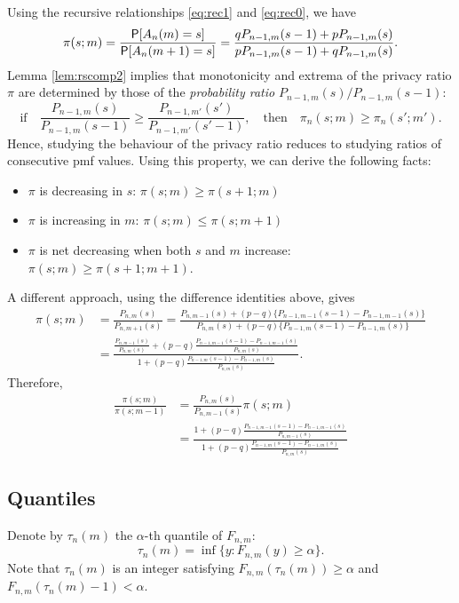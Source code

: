 \documentclass[11pt,draft]{article}
\begin{document}
Using the recursive relationships \eqref{eq:rec1} and \eqref{eq:rec0}, we have
\[ \pi(s; m) = \frac{\P[A_n(m) = s]}{\P[A_n(m+1) = s]}
 = \frac{q P_{n-1, m}(s-1) + p P_{n-1, m}(s)}
 {p P_{n-1, m}(s-1) + q P_{n-1, m}(s)}.
\]
Lemma \ref{lem:rscomp2} implies that monotonicity and extrema of  the privacy ratio $\pi$ are determined by those of the \emph{probability ratio} $P_{n-1, m}(s)/P_{n-1,m}(s-1)$:
\[ \text{if}\quad \frac{P_{n-1,m}(s)}{P_{n-1,m}(s-1)} \geq \frac{P_{n-1,m'}(s')}{P_{n-1,m'}(s'-1)},
\quad\text{then}\quad \pi_n(s;m) \geq \pi_n(s';m'). \]
Hence, studying the behaviour of the privacy ratio reduces to studying 
ratios of consecutive pmf values.
Using this property, we can derive the following facts:
\begin{itemize}
\item $\pi$ is decreasing in $s$: $\pi(s;m) \geq \pi(s+1; m)$
\item $\pi$ is increasing in $m$: $\pi(s;m) \leq \pi(s; m+1)$
\item $\pi$ is net decreasing when both $s$ and $m$ increase:
$\pi(s;m) \geq \pi(s+1; m+1)$.
\end{itemize}

A different approach, using the difference identities above, gives
\begin{align*}
\pi(s; m) &= \frac{P_{n,m}(s)}{P_{n,m+1}(s)}
 = \frac{P_{n,m-1}(s) + (p-q)\{P_{n-1,m-1}(s-1) - P_{n-1,m-1}(s)\}}
 {P_{n,m}(s) + (p-q)\{P_{n-1,m}(s-1) - P_{n-1,m}(s)\}} \\
 &= \frac{\frac{P_{n,m-1}(s)}{P_{n,m}(s)} + (p-q)\frac{P_{n-1,m-1}(s-1) - P_{n-1,m-1}(s)}{P_{n,m}(s)}}
 {1 + (p-q)\frac{P_{n-1,m}(s-1) - P_{n-1,m}(s)}{P_{n,m}(s)}}.
\end{align*}
Therefore,
\begin{align*}
\frac{\pi(s; m)}{\pi(s; m-1)} &= \frac{P_{n,m}(s)}{P_{n,m-1}(s)} \pi(s;m) \\
 &= \frac{1 + (p-q)\frac{P_{n-1,m-1}(s-1) - P_{n-1,m-1}(s)}{P_{n,m-1}(s)}}
 {1 + (p-q)\frac{P_{n-1,m}(s-1) - P_{n-1,m}(s)}{P_{n,m}(s)}}
\end{align*}


\subsection{Quantiles}

Denote by $\tau_n(m)$ the $\alpha$-th quantile of $F_{n,m}$:
\[ \tau_n(m) = \inf\{y : F_{n,m}(y) \geq \alpha \}. \]
Note that $\tau_n(m)$ is an integer satisfying $F_{n,m}(\tau_n(m)) \geq \alpha$ and $F_{n,m}(\tau_n(m) - 1) < \alpha$.
\end{document}

